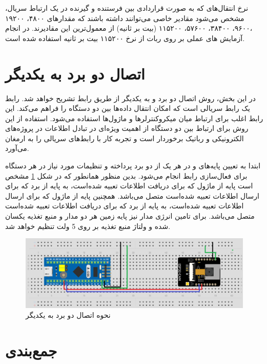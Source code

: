 نرخ انتقال‌های که به صورت قراردادی بین فرستنده و گیرنده در یک ارتباط سریال، مشخص می‌شود مقادیر خاصی می‌توانند داشته باشند که مقدارهای ۴۸۰۰، ۱۹۲۰۰ ،۹۶۰۰، ۳۸۴۰۰، ۵۷۶۰۰، ۱۱۵۲۰۰ (بیت بر ثانیه) از معمول‌ترین این مقادیرند. در انجام آزمایش های عملی بر روی ربات از نرخ ۱۱۵۲۰۰ بیت بر ثانیه استفاده شده است.


\section{اتصال دو برد به یکدیگر}


در این بخش، روش اتصال دو برد  و  به یکدیگر از طریق رابط  تشریح خواهد شد. رابط  یک رابط سریالی است که امکان انتقال داده‌ها بین دو دستگاه را فراهم می‌کند. این رابط اغلب برای ارتباط میان میکروکنترلرها و ماژول‌ها استفاده می‌شود. استفاده از این روش برای ارتباط بین دو دستگاه از اهمیت ویژه‌ای در تبادل اطلاعات در پروژه‌های الکترونیکی و رباتیک برخوردار است و تجربه کار با رابط‌های سریالی را به ارمغان می‌آورد.

ابتدا به تعیین پایه‌های  و  در هر یک از دو برد پرداخته و تنظیمات مورد نیاز در هر دستگاه برای فعال‌سازی رابط  انجام می‌شود. بدین منظور همانطور که در شکل 
\ref{اتصال دو برد}
مشخص است پایه
از ماژول
که برای دریافت اطلاعات تعبیه شده‌است، به پایه
از برد
که برای ارسال اطلاعات تعبیه شده‌است متصل می‌باشد. همچنین پایه
از ماژول
که برای ارسال اطلاعات تعبیه شده‌است، به پایه
از برد
که برای دریافت اطلاعات تعبیه شده‌است متصل می‌باشد. برای تامین انرژی مدار نیز پایه زمین هر دو مدار و منبع تغذیه یکسان شده و ولتاژ منبع تغذیه بر روی 5 ولت تنظیم خواهد شد.

\begin{figure}[H]
	\centering
	\includegraphics[width=1\textwidth]{./images/Chapter3/TwoBoardConnection}	
	\caption{نحوه اتصال دو برد  به یکدیگر}
	\label{اتصال دو برد}
\end{figure}

\section{جمع‌بندی}


